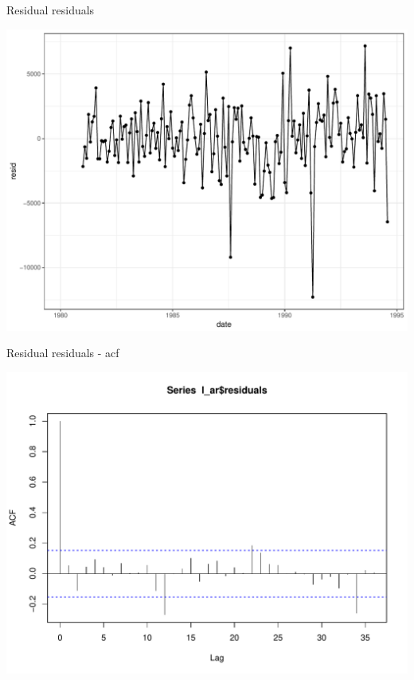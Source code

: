 \documentclass[11pt,ignorenonframetext,]{beamer}
\begin{document}
\begin{frame}{Residual residuals}

\includegraphics{Lec6_files/figure-beamer/unnamed-chunk-17-1.pdf}

\end{frame}

\begin{frame}{Residual residuals - acf}

\includegraphics{Lec6_files/figure-beamer/unnamed-chunk-18-1.pdf}

\end{frame}
\end{document}
